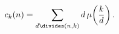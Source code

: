 \[\mathop{c_{k}\/}\nolimits\!\left(n\right)=\sum_{d\divides\left(n,k\right)}d%
\mathop{\mu\/}\nolimits\!\left(\frac{k}{d}\right).\]